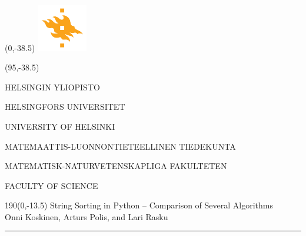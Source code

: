 \documentclass[a4paper]{article} %
\begin{document}
\pagestyle{empty} %




\begin{textblock}{95}(0,-38.5)
\includegraphics[width=22mm]{flame}
\end{textblock}	

\begin{textblock}{95}(95,-38.5)
{\fontsize{8}{7}\selectfont\sffamily\color{unigray}
\hfill HELSINGIN YLIOPISTO

\hfill HELSINGFORS UNIVERSITET

\hfill UNIVERSITY OF HELSINKI

\color{sciorange}\hfill MATEMAATTIS-LUONNONTIETEELLINEN TIEDEKUNTA

\hfill MATEMATISK-NATURVETENSKAPLIGA FAKULTETEN

\hfill FACULTY OF SCIENCE %


}
\end{textblock}


\begin{textblock}{190}(0,-13.5)
{\sffamily\LARGE{\color{sciorange}String Sorting in Python -- }{\color{unigray}
 Comparison of Several Algorithms}}\\
\small\hfill Onni Koskinen, Arturs Polis, and Lari Rasku\\ %
\rule[2mm]{190mm}{0.3pt} %
\end{textblock}
\end{document}
